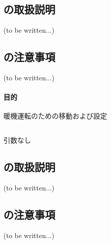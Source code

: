 \subsection{\KIncutBoring の取扱説明\TBW}
(to be written...)


\subsection{\KIncutBoring の注意事項\TBW}
(to be written...)



\clearpage

\paragraph*{目的}
暖機運転のための移動および設定


\subsection{\OwarmingupAArguments}
引数なし


\subsection{\OwarmingupA の取扱説明\TBW}
(to be written...)


\subsection{\OwarmingupA の注意事項\TBW}
(to be written...)



